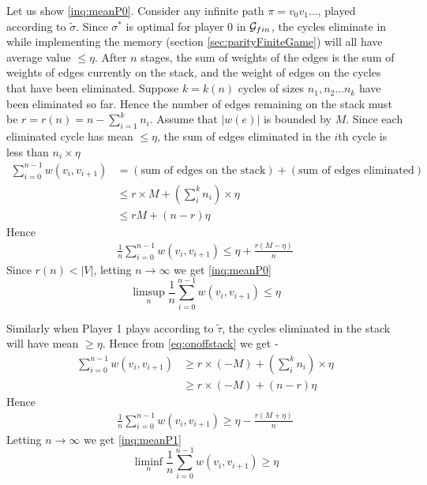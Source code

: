 Let us show \eqref{inq:meanP0}. Consider any infinite path $\pi=v_0v_1\ldots$, played according to $\tilde{\sigma}$. Since $\sigma^*$ is optimal for player 0 in $\mathcal{G}_{fin}$, the cycles eliminate in while implementing the memory (section \ref{sec:parityFiniteGame}) will all have average value $\leq \eta$. After $n$ stages, the sum of weights of the edges is the sum of weights of edges currently on the stack, and the weight of edges on the cycles that have been eliminated. Suppose $k = k(n)$ cycles of sizes $n_1, n_2 \ldots n_k$ have been eliminated so far. Hence the number of edges remaining on the stack must be $r = r(n) = n-\sum_{i=1}^k n_i$. Assume that $|w(e)|$ is bounded by $M$. Since each eliminated cycle has mean $\leq \eta$, the sum of edges eliminated in the $i$th cycle is less than $n_i \times \eta$
\begin{align}
    \sum_{i=0}^{n-1} w(v_i, v_{i+1}) &= \left(\text{sum of edges on the stack}\right) + \left(\text{sum of edges eliminated}\right)\label{eq:onoffstack}\\
    &\leq r\times M +  (\sum_i^k n_i) \times \eta \\
    &\leq rM + (n-r) \eta
\end{align}
Hence
\begin{align}
    \frac{1}{n} \sum_{i=0}^{n-1} w(v_i, v_{i+1}) \leq \eta + \frac{r(M-\eta)}{n}
\end{align} 
Since $r(n) < |V|$, letting $n \to \infty$ we get \eqref{inq:meanP0}
\[
    \limsup_n \frac{1}{n} \sum_{i=0}^{n-1} w(v_i, v_{i+1}) \leq \eta
\]

Similarly when Player 1 plays according to $\tilde{\tau}$, the cycles eliminated in the stack will have mean $\geq \eta$. Hence from \eqref{eq:onoffstack} we get -
\begin{align}
    \sum_{i=0}^{n-1} w(v_i, v_{i+1}) &\geq r\times (-M) + (\sum_i^k n_i) \times \eta \\
                                    &\geq r\times (-M) + (n-r) \eta
\end{align}
Hence
\begin{align}
    \frac{1}{n} \sum_{i=0}^{n-1} w(v_i, v_{i+1}) \geq \eta - \frac{r(M+\eta)}{n}
\end{align} 
Letting $n \to \infty$ we get \eqref{inq:meanP1}
\[
    \liminf_n \frac{1}{n} \sum_{i=0}^{n-1} w(v_i, v_{i+1}) \geq \eta
\]



